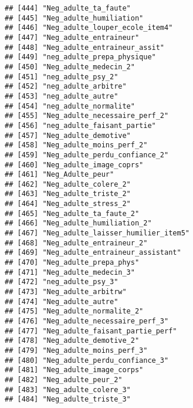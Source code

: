 \documentclass[
]{article}
\begin{document}
\begin{verbatim}
## [444] "Neg_adulte_ta_faute"                                 
## [445] "Neg_adulte_humiliation"                              
## [446] "Neg_adulte_louper_ecole_item4"                       
## [447] "Neg_adulte_entraineur"                               
## [448] "Neg_adulte_entraineur_assit"                         
## [449] "neg_adulte_prepa_physique"                           
## [450] "Neg_adulte_medecin_2"                                
## [451] "neg_adulte_psy_2"                                    
## [452] "neg_adulte_arbitre"                                  
## [453] "neg_adulte_autre"                                    
## [454] "neg_adulte_normalite"                                
## [455] "Neg_adulte_necessaire_perf_2"                        
## [456] "neg_adulte_faisant_partie"                           
## [457] "Neg_adulte_demotive"                                 
## [458] "Neg_adulte_moins_perf_2"                             
## [459] "Neg_adulte_perdu_confiance_2"                        
## [460] "Neg_adulte_image_coprs"                              
## [461] "Neg_Adulte_peur"                                     
## [462] "Neg_adulte_colere_2"                                 
## [463] "Neg_adulte_triste_2"                                 
## [464] "Neg_adulte_stress_2"                                 
## [465] "Neg_adulte_ta_faute_2"                               
## [466] "Neg_adulte_humiliation_2"                            
## [467] "Neg_adulte_laisser_humilier_item5"                   
## [468] "Neg_adulte_entraineur_2"                             
## [469] "Neg_adulte_entraineur_assistant"                     
## [470] "Neg_adulte_prepa_phys"                               
## [471] "Neg_adulte_medecin_3"                                
## [472] "neg_adulte_psy_3"                                    
## [473] "Neg_adulte_arbitrw"                                  
## [474] "Neg_adulte_autre"                                    
## [475] "Neg_adulte_normalite_2"                              
## [476] "Neg_adulte_necessaire_perf_3"                        
## [477] "Neg_adulte_faisant_partie_perf"                      
## [478] "Neg_adulte_demotive_2"                               
## [479] "Neg_adulte_moins_perf_3"                             
## [480] "Neg_adulte_perdu_confiance_3"                        
## [481] "Neg_adulte_image_corps"                              
## [482] "Neg_adulte_peur_2"                                   
## [483] "Neg_adulte_colere_3"                                 
## [484] "Neg_adulte_triste_3"                                 

\end{verbatim}
\end{document}
